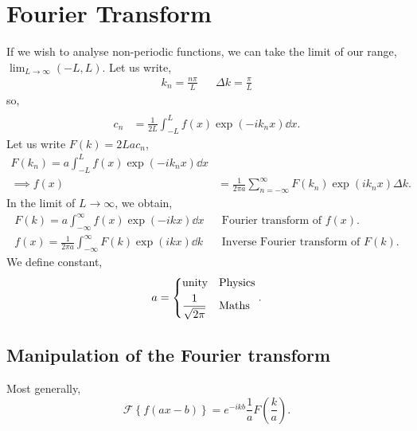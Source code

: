 \documentclass{book}
\begin{document}
\chapter{Fourier Transform}
If we wish to analyse non-periodic functions, we can take the limit of our range, $\lim_{L\to\infty}(-L,L)$. Let us write,
\begin{align}
	k_n = \frac{n\pi}{L} && \Delta k = \frac{\pi}{L}
\end{align}
so,
\begin{align}
	 \\
	c_n & = \frac{1}{2L}\int_{-L}^{L}f(x)\exp\left(-ik_nx\right)\dd{x}.
\end{align}
Let us write $F(k) = 2Lac_n$,
\begin{align}
	F(k_n) = a\int_{-L}^{L}f(x)\exp\left(-ik_nx\right)\dd{x} \\
	\implies f(x) &= \frac{1}{2\pi a}\sum_{n = -\infty}^{\infty} F(k_n)\exp\left(i k_nx\right)\Delta k.
\end{align}
In the limit of $L \to \infty$, we obtain,
\begin{align}
	\boxed{F(k) = a\int_{-\infty}^{\infty}f(x)\exp(-ikx)\dd{x}} && \text{Fourier transform of $f(x)$.}\\
	\boxed{f(x) = \frac{1}{2\pi a}\int_{-\infty}^{\infty}F(k)\exp(ikx)\dd{k}} && \text{Inverse Fourier transform of $F(k)$.}
\end{align}
We define constant,
\begin{equation}
	a = \begin{dcases}
		\text{unity} & \text{Physics} \\
		\frac{1}{\sqrt{2\pi}} & \text{Maths}
	\end{dcases}.
\end{equation}
\section{Manipulation of the Fourier transform}
Most generally,
\begin{equation}
	\boxed{\mathscr{F}\left\{f(ax - b)\right\} = e^{-ikb}\frac{1}{a}F\left(\frac{k}{a}\right)}.
\end{equation}
\newpage
\end{document}
